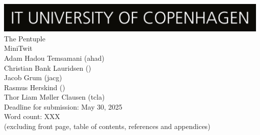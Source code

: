 \begin{titlepage}      
    \begin{center}
        \includegraphics[width=\textwidth]{images/ITU_logo.jpg}\\[1.5cm]
      
        \huge {             
            The Pentuple \\ MiniTwit
        }\\
        \vspace{2cm}
        {\Large
            Adam Hadou Temsamani (ahad) 
        }\\
        {\Large
            Christian Bank Lauridsen ()
        }\\
        {\Large
            Jacob Grum (jacg) 
        }\\
        {\Large
            Rasmus Herskind ()  
        }\\
        {\Large
            Thor Liam Møller Clausen (tcla)  
        }\\
        \vspace{2cm}
        {\Large
            Deadline for submission: May 30, 2025
        }\\
        \vspace{2cm} 
        {\large 
            Word count: XXX \\ (excluding front page, table of contents, references and appendices)
        } 
    \end{center} 
\end{titlepage}